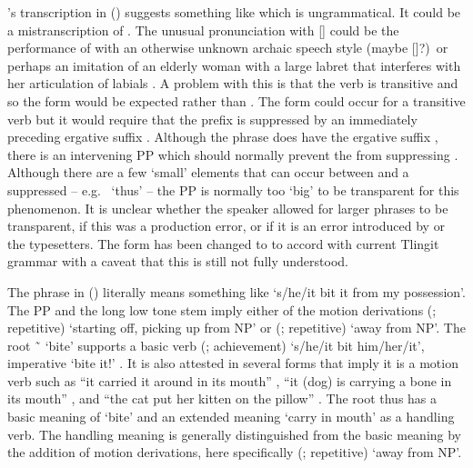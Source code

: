 \citeauthor{swanton:1909}’s transcription  in (\lastx) suggests something like  which is ungrammatical.
It could be a mistranscription of . 
The unusual pronunciation with [] could be the performance of  with an otherwise unknown archaic speech style (maybe []?)\ or perhaps an imitation of an elderly woman with a large labret that interferes with her articulation of labials \parencites[cf.][444]{de-laguna:1972}[319]{mcclellan:1975a}[245–248]{emmons:1991}[64–65]{kan:2016}.
A problem with this is that the verb is transitive and so the form  would be expected rather than .
The  form could occur for a transitive verb but it would require that the  prefix is suppressed by an immediately preceding ergative suffix  \parencites[25]{leer:1991}{crippen:2016}[724]{crippen:2019}.
Although the phrase  does have the ergative suffix , there is an intervening PP  which should normally prevent the  from suppressing .
Although there are a few ‘small’ elements that can occur between  and a suppressed  – e.g.\  ‘thus’ – the PP  is normally too ‘big’ to be transparent for this phenomenon.
It is unclear whether the speaker allowed for larger phrases to be transparent, if this was a production error, or if it is an error introduced by \citeauthor{swanton:1909} or the typesetters.
The form has been changed to  to accord with current Tlingit grammar with a caveat that this is still not fully understood.

The phrase  in (\lastx) literally means something like ‘s/he/it bit it from my possession’.
The PP  and the long low tone  stem  imply either of the motion derivations  (;  repetitive) ‘starting off, picking up from NP’ or  (;  repetitive) ‘away from NP’.
The root  \~\  ‘bite’ supports a basic verb  (; achievement) ‘s/he/it bit him/her/it’, imperative  ‘bite it!’ \parencites[03/236]{leer:1973}[217]{leer:1976}.
It is also attested in several forms that imply it is a motion verb such as
 “it carried it around in its mouth” \parencites[03/236]{leer:1973},
 “it (dog) is carrying a bone in its mouth” \parencite[43.443]{story-naish:1973},
and  “the cat put her kitten on the pillow” \parencite[163.2234]{story-naish:1973}.
The root thus has a basic meaning of ‘bite’ and an extended meaning ‘carry in mouth’ as a handling verb.
The handling meaning is generally distinguished from the basic meaning by the addition of motion derivations, here specifically  (;  repetitive) ‘away from NP’.

